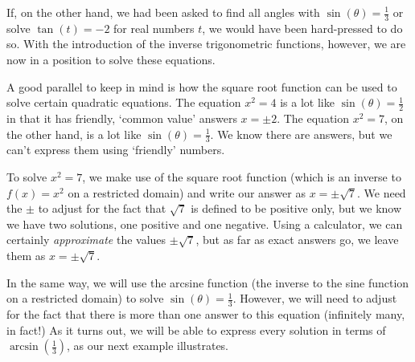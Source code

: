 \documentclass{ximera}
\begin{document}
 

 If, on the other hand, we had been asked to find all angles with $\sin(\theta) = \frac{1}{3}$ or solve $\tan(t) = -2$ for real numbers $t$, we would have been hard-pressed to do so.  With the introduction of the inverse trigonometric functions, however, we are now in a position to solve these equations. 
 
  
 
 A good parallel to keep in mind is how the square root function can be used to solve certain quadratic equations.  The equation $x^2 = 4$ is a lot like  $\sin(\theta) = \frac{1}{2}$ in that it has friendly, `common value' answers  $x = \pm 2$.   The equation $x^2 = 7$, on the other hand, is a lot like $\sin(\theta) = \frac{1}{3}$.  We know there are answers, but we can't express them using `friendly' numbers.  
 
  
 
 To solve $x^2 = 7$, we make use of the square root function (which is an inverse to $f(x) = x^2$ on a restricted domain) and write our answer as  $x = \pm \sqrt{7}$.  We need  the $\pm$ to  adjust for the fact that $\sqrt{7}$ is defined to be positive only, but we know we have two solutions, one positive and one negative.    Using a  calculator, we can certainly \textit{approximate} the values $\pm \sqrt{7}$,  but as far as exact answers go, we leave them as $x = \pm \sqrt{7}$.  
  
   
  
In the same way, we will use the arcsine function (the inverse to the sine function on a restricted domain)  to solve $\sin(\theta) = \frac{1}{3}$.  However, we will need to adjust for the fact that there is more than one answer to this equation (infinitely many, in fact!)  As it turns out, we will be able to express every solution in terms of $\arcsin\left(\frac{1}{3}\right)$, as our next example illustrates.
\end{document}
